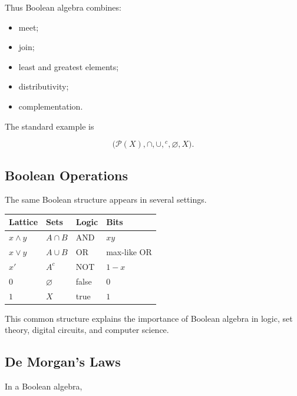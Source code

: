 Thus Boolean algebra combines:

\begin{itemize}
    \item meet;
    \item join;
    \item least and greatest elements;
    \item distributivity;
    \item complementation.
\end{itemize}

The standard example is

\[ \bigl(\mathcal P(X),\cap,\cup,{}^c,\varnothing,X\bigr). \]

\subsection{Boolean Operations}
\label{subsec:boolean-operations}

The same Boolean structure appears in several settings.

\begin{center}
\begin{tabularx}{0.92\textwidth}{@{}lXXX@{}}
\toprule
\textbf{Lattice} & \textbf{Sets} & \textbf{Logic} & \textbf{Bits}\\
\midrule
\(x\wedge y\) & \(A\cap B\) & AND & \(xy\)\\
\(x\vee y\) & \(A\cup B\) & OR & max-like OR\\
\(x'\) & \(A^c\) & NOT & \(1-x\)\\
\(0\) & \(\varnothing\) & false & \(0\)\\
\(1\) & \(X\) & true & \(1\)\\
\bottomrule
\end{tabularx}
\end{center}

This common structure explains the importance of Boolean algebra in logic,
set theory, digital circuits, and computer science.

\subsection{De Morgan's Laws}
\label{subsec:lattice-demorgan}

In a Boolean algebra,

